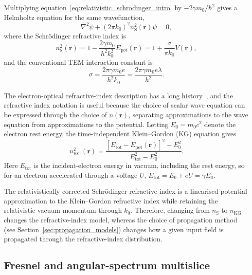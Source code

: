 \documentclass[preprint,12pt,number]{elsarticle}
\begin{document}
Multiplying equation~\eqref{eq:relativistic_schrodinger_intro} by
$-2\gamma m_0/\hbar^2$ gives a Helmholtz equation for the same wavefunction,
\begin{equation}
\label{eq:helmholtz_intro}
\nabla^2\psi+(2\pi k_0)^2 n_\mathrm{S}^2(\mathbf r)\psi=0,
\end{equation}
where the Schr\"odinger refractive index is
\begin{equation}
\label{eq:index_schrodinger_intro}
n_\mathrm{S}^2(\mathbf r)
=
1-\frac{2\gamma m_0}{h^2k_0^2}E_{\mathrm{pot}}(\mathbf r)
=
1+\frac{\sigma}{\pi k_0}V(\mathbf r),
\end{equation}
and the conventional TEM interaction constant is
\begin{equation}
\label{eq:interaction_constant}
\sigma
=
\frac{2\pi\gamma m_0e}{h^2k_0}
=
\frac{2\pi\gamma m_0e\lambda}{h^2}.
\end{equation}

The electron-optical refractive-index description has a long
history~\cite{Glaser1933,Ehrenberg-Siday1949,Reimer1989}, and the refractive index
notation is useful because the choice of scalar wave equation can be
expressed through the choice of $n(\mathbf r)$, separating approximations to the
wave equation from approximations to the potential. Letting
$E_0=m_0c^2$ denote the electron rest energy, the time-independent
Klein--Gordon (KG) equation gives
\begin{equation}
\label{eq:index_kg_intro}
n_\mathrm{KG}^2(\mathbf r)
=
\frac{
\left[E_{\mathrm{tot}}-E_{\mathrm{pot}}(\mathbf r)\right]^2-E_0^2
}{
E_{\mathrm{tot}}^2-E_0^2
}.
\end{equation}
Here $E_{\mathrm{tot}}$ is the incident-electron energy in vacuum, including
the rest energy, so for an electron accelerated through a voltage $U$,
$E_{\mathrm{tot}}=E_0+eU=\gamma E_0$.
 
The relativistically corrected Schr\"odinger refractive index is a linearised
potential approximation to the Klein--Gordon refractive index while retaining
the relativistic vacuum momentum through $k_0$. Therefore, changing
from $n_\mathrm{S}$ to $n_\mathrm{KG}$ changes the refractive-index model,
whereas the choice of propagation method (see
Section~\ref{sec:propagation_models}) changes how a given input field is
propagated through the refractive-index distribution.

\subsection{Fresnel and angular-spectrum multislice}
\label{sec:fresnel_angular_spectrum}
\end{document}
